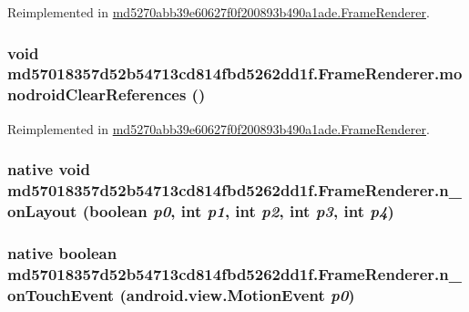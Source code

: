 Reimplemented in \hyperlink{classmd5270abb39e60627f0f200893b490a1ade_1_1_frame_renderer_fab5536e45566fe5a5bb5bd22faef608}{md5270abb39e60627f0f200893b490a1ade.FrameRenderer}.\hypertarget{classmd57018357d52b54713cd814fbd5262dd1f_1_1_frame_renderer_7c48666937065ca752fc6c9435980aaa}{
\subsubsection[{monodroidClearReferences}]{\setlength{\rightskip}{0pt plus 5cm}void md57018357d52b54713cd814fbd5262dd1f.FrameRenderer.monodroidClearReferences ()}}
\label{classmd57018357d52b54713cd814fbd5262dd1f_1_1_frame_renderer_7c48666937065ca752fc6c9435980aaa}




Reimplemented in \hyperlink{classmd5270abb39e60627f0f200893b490a1ade_1_1_frame_renderer_d655b8c79cca686e12df7655fe93f7f7}{md5270abb39e60627f0f200893b490a1ade.FrameRenderer}.\hypertarget{classmd57018357d52b54713cd814fbd5262dd1f_1_1_frame_renderer_87f46153d75eb9e5c7125d71c81795a2}{
\subsubsection[{n\_\-onLayout}]{\setlength{\rightskip}{0pt plus 5cm}native void md57018357d52b54713cd814fbd5262dd1f.FrameRenderer.n\_\-onLayout (boolean {\em p0}, \/  int {\em p1}, \/  int {\em p2}, \/  int {\em p3}, \/  int {\em p4})}}
\label{classmd57018357d52b54713cd814fbd5262dd1f_1_1_frame_renderer_87f46153d75eb9e5c7125d71c81795a2}


\hypertarget{classmd57018357d52b54713cd814fbd5262dd1f_1_1_frame_renderer_a8a945d3dcb94555c8ceb309979a5a3d}{
\subsubsection[{n\_\-onTouchEvent}]{\setlength{\rightskip}{0pt plus 5cm}native boolean md57018357d52b54713cd814fbd5262dd1f.FrameRenderer.n\_\-onTouchEvent (android.view.MotionEvent {\em p0})}}
\label{classmd57018357d52b54713cd814fbd5262dd1f_1_1_frame_renderer_a8a945d3dcb94555c8ceb309979a5a3d}


